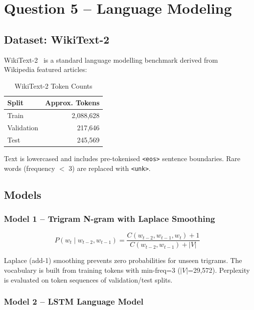 \section{Question 5 -- Language Modeling}

\subsection{Dataset: WikiText-2}

WikiText-2~\cite{merity2017pointer} is a standard language modelling
benchmark derived from Wikipedia featured articles:

\begin{table}[H]
  \centering
  \caption{WikiText-2 Token Counts}
  \label{tab:q5_data}
  \begin{tabular}{lr}
    \toprule
    \textbf{Split} & \textbf{Approx. Tokens} \\ \midrule
    Train      & 2{,}088{,}628 \\
    Validation &   217{,}646  \\
    Test       &   245{,}569  \\
    \bottomrule
  \end{tabular}
\end{table}

Text is lowercased and includes pre-tokenised \texttt{<eos>} sentence boundaries.
Rare words (frequency $<$ 3) are replaced with \texttt{<unk>}.

\subsection{Models}

\subsubsection{Model 1 -- Trigram N-gram with Laplace Smoothing}

$$P(w_t \mid w_{t-2}, w_{t-1}) = \frac{C(w_{t-2}, w_{t-1}, w_t) + 1}{C(w_{t-2}, w_{t-1}) + |V|}$$

Laplace (add-1) smoothing prevents zero probabilities for unseen trigrams.
The vocabulary is built from training tokens with min-freq=3 ($|V|$=29{,}572).
Perplexity is evaluated on token sequences of validation/test splits.

\subsubsection{Model 2 -- LSTM Language Model}

